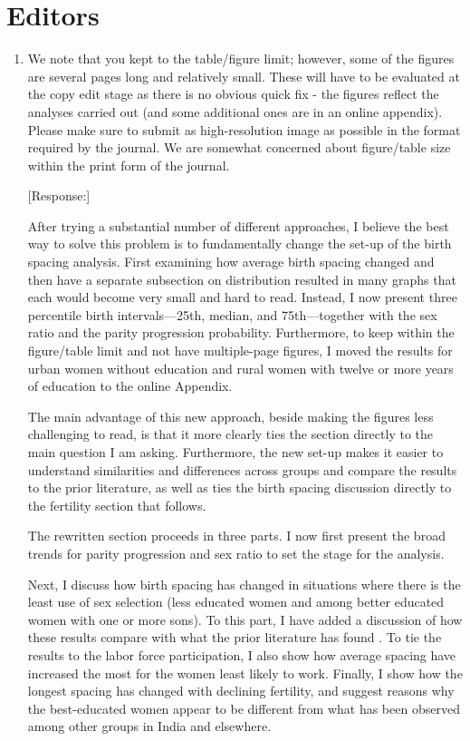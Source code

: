 \documentclass[letterpaper,12pt]{article}
\begin{document}
\section*{Editors}

\begin{enumerate}

\item We note that you kept to the table/figure limit; however, some of
the figures are several pages long and relatively small. These will have
to be evaluated at the copy edit stage as there is no obvious quick fix
- the figures reflect the analyses carried out (and some additional ones
are in an online appendix). Please make sure to submit as
high-resolution image as possible in the format required by the journal.
We are somewhat concerned about figure/table size within the print form
of the journal.

[Response:]

After trying a substantial number of different approaches, I believe the best way to 
solve this problem is to fundamentally change the set-up of the birth spacing analysis.
First examining how average birth spacing changed and then have a separate subsection on 
distribution resulted in many graphs that each would become very small and hard to read.
Instead, I now present three percentile birth intervals---25th, median, and 75th---together
with the sex ratio and the parity progression probability.
Furthermore, to keep within the figure/table limit and not have multiple-page figures,
I moved the results for urban women without education and rural women with twelve or more 
years of education to the online Appendix.

The main advantage of this new approach, beside making the figures less challenging to 
read, is that it more clearly ties the section directly to the main question I am asking.
Furthermore, the new set-up makes it easier to understand similarities and differences 
across groups and compare the results to the prior literature, as well as ties the
birth spacing discussion directly to the fertility section that follows.

The rewritten section proceeds in three parts.
I now first present the broad trends for parity progression and sex ratio to set the
stage for the analysis.

Next, I discuss how birth spacing has changed in situations where there is the least use
of sex selection (less educated women and among better educated women with one or more
sons).
To this part, I have added a discussion of how these results compare with what the
prior literature has found \citep{Rutstein2011,Casterline2016}.
To tie the results to the labor force participation, I also show how average spacing
have increased the most for the women least likely to work.
Finally, I show how the longest spacing has changed with declining fertility, and suggest 
reasons why the best-educated women appear to be different from what has been observed 
among other groups in India and elsewhere.


\end{enumerate}
\end{document}
